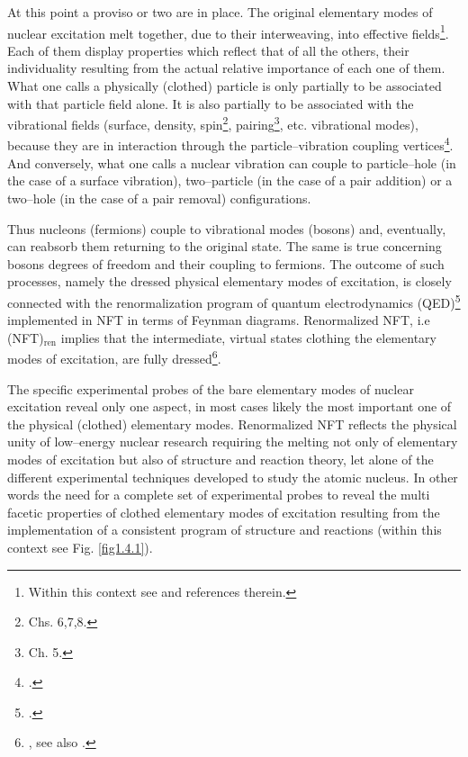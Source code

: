At this point a proviso or two are in place. The original elementary modes of nuclear excitation melt together, due to their interweaving, into effective fields\footnote{Within this context see \cite{Dickhoff:05} and references therein.}. Each of them display properties which reflect that of all the others, their individuality resulting from the actual relative importance of each one of them. What one calls a physically  (clothed) particle is only partially to be associated with that particle field alone. It is also partially to be associated with the  vibrational fields
 (surface, density, spin\footnote{\cite{Bertsch:05} Chs. 6,7,8.}, pairing\footnote{\cite{Brink:05} Ch. 5.}, etc. vibrational modes), 
 because they are in interaction through the particle--vibration coupling vertices\footnote{\cite{Bohr:75}.}. And conversely, what one calls a nuclear vibration can couple to  particle--hole (in the case of a surface vibration),  two--particle (in the case of a pair addition) or a two--hole (in the case of a pair removal)  configurations. 
 
 
 Thus nucleons (fermions)  couple to  vibrational modes (bosons) and, eventually, can reabsorb them returning to the original state. The same is true concerning bosons degrees of freedom and their coupling to fermions.  The outcome of such processes, namely the dressed physical elementary modes of excitation, is closely connected with the renormalization program of quantum electrodynamics (QED)\footnote{\cite{Feynman:75,Schwinger:01}.} implemented in NFT in terms of Feynman diagrams. Renormalized NFT, i.e (NFT)$_{\text{ren}}$ implies that the intermediate, virtual states clothing the elementary modes of excitation, are fully dressed\footnote{\cite{Barranco:17}, see also \cite{Broglia:16}.}. 
  
 
  The specific experimental probes of the bare elementary modes of nuclear excitation reveal only one aspect, in most cases likely the most important one of the physical (clothed) elementary modes. Renormalized NFT  reflects the physical unity of  low--energy nuclear research requiring the melting not only of elementary modes of excitation but also of structure and reaction theory, let alone of the different experimental techniques developed to study the atomic nucleus. In other words the need for a complete set of experimental probes to reveal the multi facetic properties of clothed elementary modes of excitation resulting  from the implementation of  a consistent program of structure and reactions (within this context see  Fig. \ref{fig1.4.1}).


